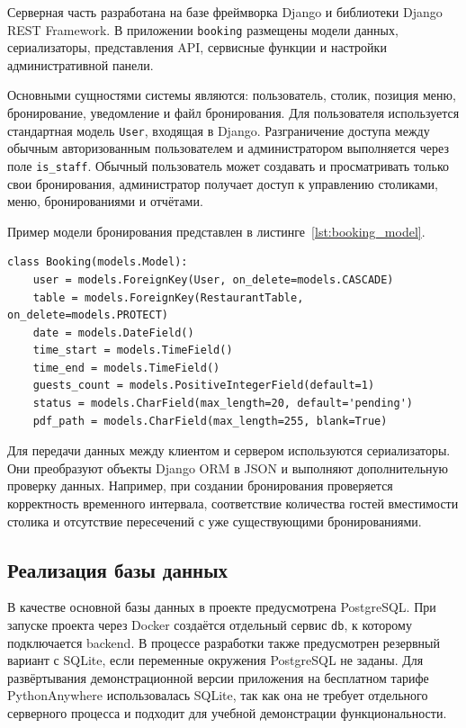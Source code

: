 Серверная часть разработана на базе фреймворка Django и библиотеки Django REST
Framework. В приложении \texttt{booking} размещены модели данных, сериализаторы,
представления API, сервисные функции и настройки административной панели.

Основными сущностями системы являются: пользователь, столик, позиция меню,
бронирование, уведомление и файл бронирования. Для пользователя используется
стандартная модель \texttt{User}, входящая в Django. Разграничение доступа между
обычным авторизованным пользователем и администратором выполняется через поле
\texttt{is\_staff}. Обычный пользователь может создавать и просматривать только
свои бронирования, администратор получает доступ к управлению столиками, меню,
бронированиями и отчётами.

Пример модели бронирования представлен в листинге~\ref{lst:booking_model}.

\begin{lstlisting}[caption={Фрагмент модели бронирования}, label={lst:booking_model}]
class Booking(models.Model):
    user = models.ForeignKey(User, on_delete=models.CASCADE)
    table = models.ForeignKey(RestaurantTable, on_delete=models.PROTECT)
    date = models.DateField()
    time_start = models.TimeField()
    time_end = models.TimeField()
    guests_count = models.PositiveIntegerField(default=1)
    status = models.CharField(max_length=20, default='pending')
    pdf_path = models.CharField(max_length=255, blank=True)
\end{lstlisting}

Для передачи данных между клиентом и сервером используются сериализаторы. Они
преобразуют объекты Django ORM в JSON и выполняют дополнительную проверку данных.
Например, при создании бронирования проверяется корректность временного интервала,
соответствие количества гостей вместимости столика и отсутствие пересечений с уже
существующими бронированиями.

\subsection{Реализация базы данных}

В качестве основной базы данных в проекте предусмотрена PostgreSQL. При запуске проекта через
Docker создаётся отдельный сервис \texttt{db}, к которому подключается backend.
В процессе разработки также предусмотрен резервный вариант с SQLite, если переменные
окружения PostgreSQL не заданы. Для развёртывания демонстрационной версии приложения
на бесплатном тарифе PythonAnywhere использовалась SQLite, так как она не требует
отдельного серверного процесса и подходит для учебной демонстрации функциональности.

